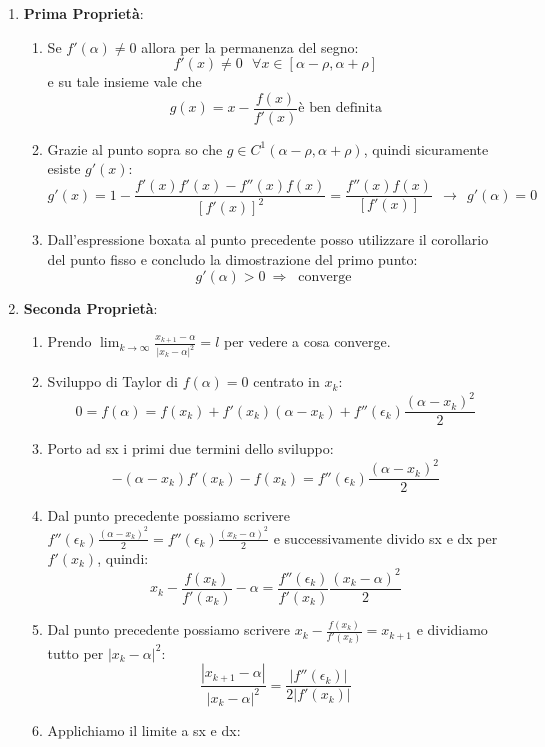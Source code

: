 \documentclass{article}
\begin{document}
\begin{enumerate}
    \item \textbf{Prima Proprietà}:
    \begin{enumerate}
        \item Se $f'(\alpha) \neq 0$ allora per la permanenza del segno:
        \[ f'(x) \neq 0 \:\:\: \forall x \in [\alpha - \rho, \alpha + \rho] \]
        e su tale insieme vale che
        \[ g(x) = x - \frac{f(x)}{f'(x)} \text{è ben definita}\]
        \item Grazie al punto sopra so che $g \in C^{1}(\alpha - \rho, \alpha + \rho)$, quindi sicuramente esiste $g'(x)$:
        \[ g'(x) = 1 - \frac{f'(x)f'(x) - f''(x)f(x)}{[f'(x)]^{2}} = \frac{f''(x)f(x)}{[f'(x)]} \:\: \rightarrow \:\: \boxed{g'(\alpha) = 0} \]
        \item Dall'espressione boxata al punto precedente posso utilizzare il corollario del punto fisso e concludo la dimostrazione del primo punto:
        \[ g'(\alpha) > 0 \: \Rightarrow \: \text{ converge } \]
    \end{enumerate}
    \item \textbf{Seconda Proprietà}:
    \begin{enumerate}
        \item Prendo $\lim_{k \rightarrow \infty} \frac{x_{k+1} - \alpha}{|x_{k} - \alpha |^{2}} = l$ per vedere a cosa converge.
        \item Sviluppo di Taylor di $f(\alpha) = 0$ centrato in $x_{k}$:
        \[ 0 = f(\alpha) = f(x_{k}) + f'(x_{k})(\alpha - x_{k}) + f''(\epsilon_{k})\frac{(\alpha - x_{k})^{2}}{2}  \]
        \item Porto ad sx i primi due termini dello sviluppo:
        \[ - (\alpha - x_{k})f'(x_{k}) - f(x_{k}) = f''(\epsilon_{k})\frac{(\alpha - x_{k})^{2}}{2} \]
        \item Dal punto precedente possiamo scrivere $f''(\epsilon_{k})\frac{(\alpha - x_{k})^{2}}{2} = f''(\epsilon_{k})\frac{(x_{k} - \alpha)^{2}}{2}$ e successivamente divido sx e dx per $f'(x_{k})$, quindi:
        \[ x_{k} - \frac{f(x_{k})}{f'(x_{k})} - \alpha = \frac{f''(\epsilon_{k})}{f'(x_{k})} \frac{(x_{k} - \alpha)^{2}}{2} \]
        \item Dal punto precedente possiamo scrivere $x_{k} - \frac{f(x_{k})}{f'(x_{k})} = x_{k+1}$ e dividiamo tutto per $|x_{k} - \alpha|^{2}$:
        \[ \frac{|x_{k+1} - \alpha|}{|x_{k} - \alpha|^{2}} = \frac{|f''(\epsilon_{k})|}{2|f'(x_{k})|} \]
\newpage
        \item Applichiamo il limite a sx e dx:

\end{enumerate}
\end{enumerate}
\end{document}
